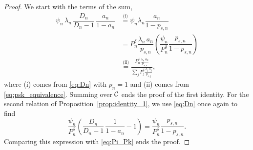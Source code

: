 \begin{proof}
	We start with the terms of the sum,
	\begin{align*}
		\psi_n\,\lambda_n\,\dfrac{D_n}{D_n-1}\,\dfrac{a_n}{1-a_n}
        &\stackrel{\text{(i)}}{=} \psi_n\lambda_n\dfrac{a_n}{1-p_{s,n}}\\ 
		&= P_n^\delta \dfrac{\lambda_n\,a_n}{p_{s,n}} \left( 
        \dfrac{\psi_n}{P_n^\delta} \dfrac{p_{s,n}}{1-p_{s,n}} \right)\\
        &\stackrel{\text{(ii)}}{=} \frac{ P_n^\delta\frac{\lambda_n\,a_n}{p_{s,n}} }
        { \sum_j P_j^\delta\frac{\lambda_j\,a_j}{p_{s,j}} },
	\end{align*}
    where (i) comes from \eqref{eq:Dn} with $p_n=1$ and (ii) comes from \eqref{eq:psk_equivalence}. Summing over $\cal{C}$ ends the proof of the first identity.
    For the second relation of Proposition~\ref{prop:identity_1}, we use \eqref{eq:Dn} once again to find
    \begin{equation*}
    	\dfrac{\psi_n}{P_n^\delta} \left( \dfrac{D_n}{D_n-1}\,\dfrac{1}{1-a_n} - 1\right) = \dfrac{\psi_n}{P_n^\delta} \dfrac{p_{s,n}}{1-p_{s,n}}.
    \end{equation*}
    Comparing this expression with \eqref{eq:Pi_Pk} ends the proof.
\end{proof}

